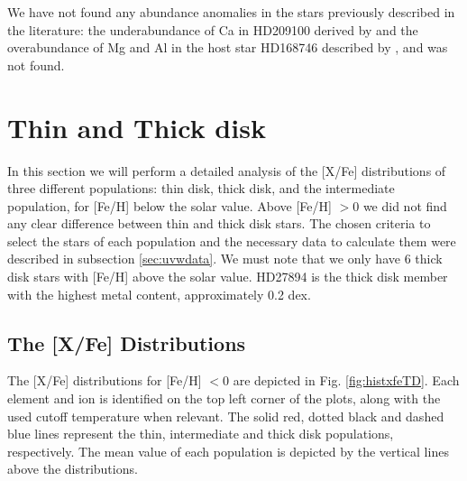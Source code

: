 \documentclass[oldversion]{aa}
\begin{document}
We have not found any abundance anomalies in the stars previously described in the literature: the underabundance of Ca in HD209100 derived by \citet{Bodaghee-2003} %
and the overabundance of Mg and Al in the host star HD168746 described by \citet{Sadakane-2002}, \citet{Laws-2003} and \citet{Gilli-2006}  was not found. %






\section{Thin and Thick disk}
\label{sec:disk}

In this section we will perform a detailed analysis of the [X/Fe] distributions of three different populations: thin disk, thick disk,  and the intermediate population, for [Fe/H] below the solar value. Above [Fe/H] $>0$ we did not find any clear difference between thin and thick disk stars. %
The chosen criteria to select the stars of each population and the necessary data to calculate them were described in subsection \ref{sec:uvwdata}. We must note that we only have 6 thick disk stars with [Fe/H] above the solar value. HD27894 is the thick disk member with the highest metal content, approximately 0.2 dex. 



\subsection {The [X/Fe] Distributions}

The [X/Fe] distributions for [Fe/H] $< 0$ are depicted in Fig. \ref{fig:histxfeTD}. Each element and ion is identified on the top left corner of the plots, along with the used cutoff temperature when relevant. The solid red, dotted black and dashed blue lines represent the thin, intermediate and thick disk populations, respectively. The mean value of each population is depicted by the vertical lines above the distributions.
\end{document}
